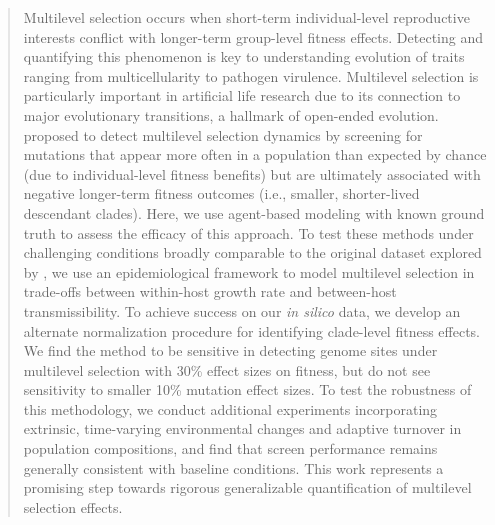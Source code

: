 \begin{abstract}
Multilevel selection occurs when short-term individual-level reproductive interests conflict with longer-term group-level fitness effects.
Detecting and quantifying this phenomenon is key to understanding evolution of traits ranging from multicellularity to pathogen virulence.
Multilevel selection is particularly important in artificial life research due to its connection to major evolutionary transitions, a hallmark of open-ended evolution.
\citet{BonettiFranceschi2024phylogenetic} proposed to detect multilevel selection dynamics by screening for mutations that appear more often in a population than expected by chance (due to individual-level fitness benefits) but are ultimately associated with negative longer-term fitness outcomes (i.e., smaller, shorter-lived descendant clades).
Here, we use agent-based modeling with known ground truth to assess the efficacy of this approach.
To test these methods under challenging conditions broadly comparable to the original dataset explored by \citet{BonettiFranceschi2024phylogenetic}, we use an epidemiological framework to model multilevel selection in trade-offs between within-host growth rate and between-host transmissibility.
To achieve success on our \textit{in silico} data, we develop an alternate normalization procedure for identifying clade-level fitness effects.
We find the method to be sensitive in detecting genome sites under multilevel selection with 30\% effect sizes on fitness, but do not see sensitivity to smaller 10\% mutation effect sizes.
To test the robustness of this methodology, we conduct additional experiments incorporating extrinsic, time-varying environmental changes and adaptive turnover in population compositions, and find that screen performance remains generally consistent with baseline conditions.
This work represents a promising step towards rigorous generalizable quantification of multilevel selection effects.
\end{abstract}

